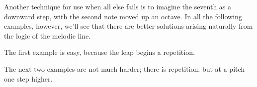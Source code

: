 \documentclass{sight}
\begin{document}
\pagebreak[3]\par
\vspace{5mm}\begin{samepage}Another technique for use when all else fails is to imagine the seventh as a downward step, with the second note moved up an octave. In all the following examples, however, we'll see that there are better solutions arising naturally from the logic of the melodic line.\\
\end{samepage}


\pagebreak[3]\par
\vspace{5mm}\begin{samepage}The first example is easy, because the leap begins a repetition.\\


\pagebreak[3]\par
\par
{}
%
%
\label{tune:305}%
{%
\parindent 0pt
\noindent
\ifx\preLilyPondExample \undefined
\else
  \expandafter\preLilyPondExample
\fi
\def\lilypondbook{}%

\ifx\postLilyPondExample \undefined
\else
  \expandafter\postLilyPondExample
\fi
}
\end{samepage}


\pagebreak[3]\par
\vspace{5mm}\begin{samepage}The next two examples are not much harder; there is repetition, but at a pitch one step higher.\\


\pagebreak[3]\par
\par
{}
%
%
\label{tune:306}%
{%
\parindent 0pt
\noindent
\ifx\preLilyPondExample \undefined
\else
  \expandafter\preLilyPondExample
\fi
\def\lilypondbook{}%

\ifx\postLilyPondExample \undefined
\else
  \expandafter\postLilyPondExample
\fi
}
\end{samepage}
\end{document}
